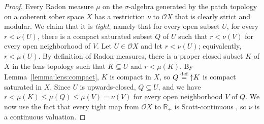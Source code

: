 \documentclass[preprint,12pt]{elsarticle}
\newcommand\eqdef{\mathrel{\buildrel \text{def}\over=}}
\newcommand{\creal}{\overline{\mathbb{R}}_+}
\DeclareMathOperator{\upc}{\uparrow\!}
\newcommand\Open{{\mathcal O}}
\begin{document}
\begin{proof}
%  
  Every Radon measure $\mu$ on the $\sigma$-algebra generated by the
  patch topology on a coherent sober space $X$ has a restriction $\nu$
  to $\Open X$ that is clearly strict and modular.  We claim that it
  is \emph{tight}, namely that for every open subset $U$, for every
  $r < \nu (U)$, there is a compact saturated subset $Q$ of $U$ such
  that $r < \nu (V)$ for every open neighborhood of $V$.  Let
  $U \in \Open X$ and let $r < \nu (U)$; equivalently, $r < \mu (U)$.
  By definition of Radon measures, there is a proper closed subset $K$
  of $X$ in the lens topology such that $K \subseteq U$ and
  $r < \mu (K)$.  By Lemma~\ref{lemma:lens:compact}, $K$ is compact in
  $X$, so $Q \eqdef \upc K$ is compact saturated in $X$.  Since $U$ is
  upwards-closed, $Q \subseteq U$, and we have
  $r < \mu (K) \leq \mu (Q) \leq \mu (V) = \nu (V)$ for every open
  neighborhood $V$ of $Q$.  We now use the fact that every tight map
  from $\Open X$ to $\creal$ is Scott-continuous
  \cite[Lemma~6.2]{JGL:kolmogorov}, so $\nu$ is a continuous
  valuation.
  

\end{proof}
\end{document}
